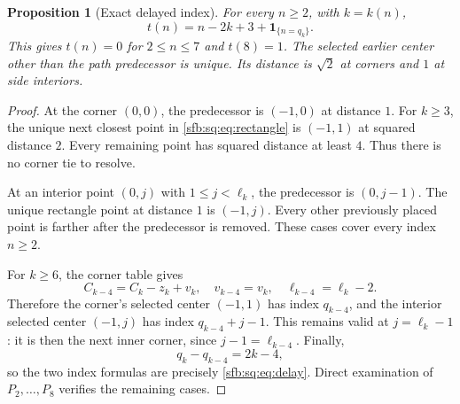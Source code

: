 \documentclass[11pt]{article}
\newtheorem{proposition}[theorem]{Proposition}
\theoremstyle{remark}\newtheorem{remark}[theorem]{Remark}
\newcommand{\one}{\boldsymbol 1}
\begin{document}
\begin{proposition}[Exact delayed index]\label{sfb:sq:prop:delay}
For every $n\ge2$, with $k=k(n)$,
\begin{equation}\label{sfb:sq:eq:delay}
 t(n)=n-2k+3+\one_{\{n=q_k\}}.
\end{equation}
This gives $t(n)=0$ for $2\le n\le7$ and $t(8)=1$. The selected earlier center other than the path predecessor is unique. Its distance is $\sqrt2$ at corners and $1$ at side interiors.
\end{proposition}
\begin{proof}
At the corner $(0,0)$, the predecessor is $(-1,0)$ at distance $1$. For $k\ge3$, the unique next closest point in \eqref{sfb:sq:eq:rectangle} is $(-1,1)$ at squared distance $2$. Every remaining point has squared distance at least $4$. Thus there is no corner tie to resolve.

At an interior point $(0,j)$ with $1\le j<\ell_k$, the predecessor is $(0,j-1)$. The unique rectangle point at distance $1$ is $(-1,j)$. Every other previously placed point is farther after the predecessor is removed. These cases cover every index $n\ge2$.

For $k\ge6$, the corner table gives
\begin{equation}\label{sfb:sq:eq:innercorner}
 C_{k-4}=C_k-z_k+v_k,\quad v_{k-4}=v_k,
 \quad \ell_{k-4}=\ell_k-2.
\end{equation}
Therefore the corner's selected center $(-1,1)$ has index $q_{k-4}$, and the interior selected center $(-1,j)$ has index $q_{k-4}+j-1$. This remains valid at $j=\ell_k-1$: it is then the next inner corner, since $j-1=\ell_{k-4}$. Finally,
\begin{equation}\label{sfb:sq:eq:quarterdiff}
 q_k-q_{k-4}=2k-4,
\end{equation}
so the two index formulas are precisely \eqref{sfb:sq:eq:delay}. Direct examination of $P_2,\ldots,P_8$ verifies the remaining cases.
\end{proof}
\end{document}
